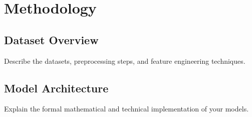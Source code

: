 \chapter{Methodology}
\label{ch:methodology}

\section{Dataset Overview}
Describe the datasets, preprocessing steps, and feature engineering techniques.

\section{Model Architecture}
Explain the formal mathematical and technical implementation of your models.